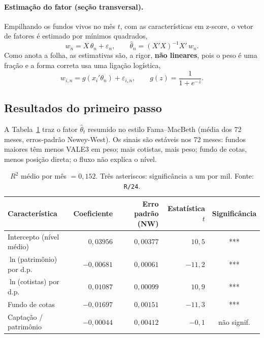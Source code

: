 \documentclass[11pt,a4paper]{article}
\begin{document}
\paragraph{Estimação do fator (seção transversal).} Empilhando os fundos vivos no mês $t$, com as
características em z-score, o vetor de fatores é estimado por mínimos quadrados,
\begin{equation}
w_n = X\,\theta_n + \varepsilon_n, \qquad
\widehat{\theta}_n = (X'X)^{-1} X'\,w_n .
\label{eq:ols_theta}
\end{equation}
Como anota a folha, as estimativas são, a rigor, \textbf{não lineares}, pois o peso é uma fração e a
forma correta usa uma ligação logística,
\begin{equation}
w_{i,n} = g\!\left(x_i'\theta_n\right) + \varepsilon_{i,n}, \qquad g(z)=\frac{1}{1+e^{-z}} .
\label{eq:logit}
\end{equation}

\subsection{Resultados do primeiro passo}

A Tabela~\ref{tab:theta} traz o fator $\widehat{\theta}_t$ resumido no estilo Fama--MacBeth (média
dos 72 meses, erros-padrão Newey-West). Os sinais são estáveis nos 72 meses: fundos maiores têm
menos VALE3 em peso; mais cotistas, mais peso; fundo de cotas, menos posição direta; o fluxo não
explica o nível.

\begin{table}[h]\centering\small
\caption{Fator latente $\widehat\theta_t$: regressão transversal do peso, padronizada (Fama--MacBeth,
72 meses; erros-padrão Newey-West).}
\label{tab:theta}
\begin{tabular}{@{}lrrrc@{}}
\toprule
Característica & Coeficiente & Erro padrão (NW) & Estatística $t$ & Significância \\
\midrule
Intercepto (nível médio)      & $0{,}03956$ & $0{,}00377$ & $10{,}5$  & *** \\
$\ln$(patrimônio) por d.p.    & $-0{,}00681$ & $0{,}00061$ & $-11{,}2$ & *** \\
$\ln$(cotistas) por d.p.      & $0{,}01087$  & $0{,}00099$ & $10{,}9$  & *** \\
Fundo de cotas                & $-0{,}01697$ & $0{,}00151$ & $-11{,}3$ & *** \\
Captação / patrimônio         & $-0{,}00044$ & $0{,}00412$ & $-0{,}1$  & não signif. \\
\bottomrule
\end{tabular}
\caption*{\footnotesize $R^2$ médio por mês $=0{,}152$. Três asteriscos: significância a um por mil.
Fonte: \texttt{R/24}.}
\end{table}
\end{document}
